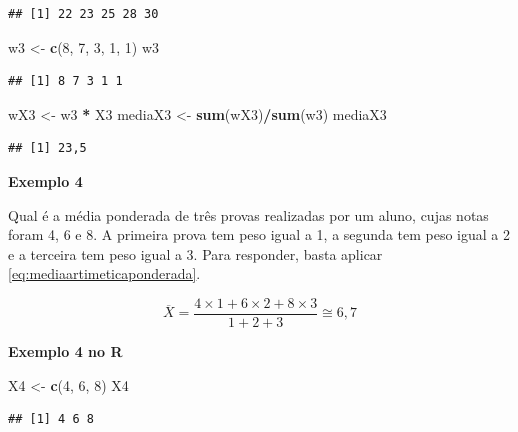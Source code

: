 \documentclass[
]{book}
\newenvironment{Shaded}{\begin{snugshade}}{\end{snugshade}}
\newcommand{\DecValTok}[1]{\textcolor[rgb]{0.00,0.00,0.81}{#1}}
\newcommand{\KeywordTok}[1]{\textcolor[rgb]{0.13,0.29,0.53}{\textbf{#1}}}
\newcommand{\NormalTok}[1]{#1}
\newcommand{\OperatorTok}[1]{\textcolor[rgb]{0.81,0.36,0.00}{\textbf{#1}}}
\newcommand{\StringTok}[1]{\textcolor[rgb]{0.31,0.60,0.02}{#1}}
\begin{document}
\begin{verbatim}
## [1] 22 23 25 28 30
\end{verbatim}

\begin{Shaded}
\begin{Highlighting}[]
\NormalTok{w3 <-}\StringTok{ }\KeywordTok{c}\NormalTok{(}\DecValTok{8}\NormalTok{, }\DecValTok{7}\NormalTok{, }\DecValTok{3}\NormalTok{, }\DecValTok{1}\NormalTok{, }\DecValTok{1}\NormalTok{)}
\NormalTok{w3}
\end{Highlighting}
\end{Shaded}

\begin{verbatim}
## [1] 8 7 3 1 1
\end{verbatim}

\begin{Shaded}
\begin{Highlighting}[]
\NormalTok{wX3 <-}\StringTok{ }\NormalTok{w3 }\OperatorTok{*}\StringTok{ }\NormalTok{X3}
\NormalTok{mediaX3 <-}\StringTok{ }\KeywordTok{sum}\NormalTok{(wX3)}\OperatorTok{/}\KeywordTok{sum}\NormalTok{(w3)}
\NormalTok{mediaX3}
\end{Highlighting}
\end{Shaded}

\begin{verbatim}
## [1] 23,5
\end{verbatim}

\textbf{Exemplo 4}

Qual é a média ponderada de três provas realizadas por um aluno, cujas notas foram 4, 6 e 8. A primeira prova tem peso igual a 1, a segunda tem peso igual a 2 e a terceira tem peso igual a 3. Para responder, basta aplicar \eqref{eq:mediaartimeticaponderada}.

\begin{equation*}
  \overline{X} = \frac{4 \times 1 + 6 \times 2 + 8 \times 3}{1 + 2 + 3} \cong 6,7
\end{equation*}

\textbf{Exemplo 4 no R}

\begin{Shaded}
\begin{Highlighting}[]
\NormalTok{X4 <-}\StringTok{ }\KeywordTok{c}\NormalTok{(}\DecValTok{4}\NormalTok{, }\DecValTok{6}\NormalTok{, }\DecValTok{8}\NormalTok{)}
\NormalTok{X4}
\end{Highlighting}
\end{Shaded}

\begin{verbatim}
## [1] 4 6 8
\end{verbatim}
\end{document}
